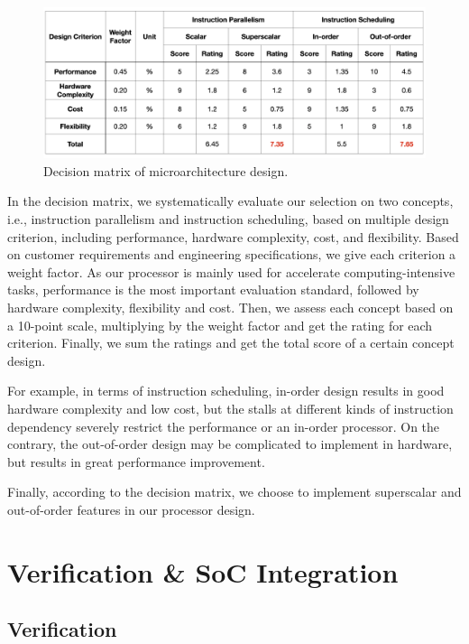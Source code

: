 \begin{figure}[!htp]
    \centering
    \includegraphics[width=\textwidth]{figure/dm-uarch.png}
    \caption{Decision matrix of microarchitecture design.}
    \label{fig:dm-uarch}
\end{figure}

In the decision matrix, we systematically evaluate our selection on two concepts, i.e., instruction parallelism and instruction scheduling, based on multiple design criterion, including performance, hardware complexity, cost, and flexibility. Based on customer requirements and engineering specifications, we give each criterion a weight factor. As our processor is mainly used for accelerate computing-intensive tasks, performance is the most important evaluation standard, followed by hardware complexity, flexibility and cost. Then, we assess each concept based on a 10-point scale, multiplying by the weight factor and get the rating for each criterion. Finally, we sum the ratings and get the total score of a certain concept design.

For example, in terms of instruction scheduling, in-order design results in good hardware complexity and low cost, but the stalls at different kinds of instruction dependency severely restrict the performance or an in-order processor. On the contrary, the out-of-order design may be complicated to implement in hardware, but results in great performance improvement.

Finally, according to the decision matrix, we choose to implement superscalar and out-of-order features in our processor design.


\section{Verification \& SoC Integration} %

\subsection{Verification}
